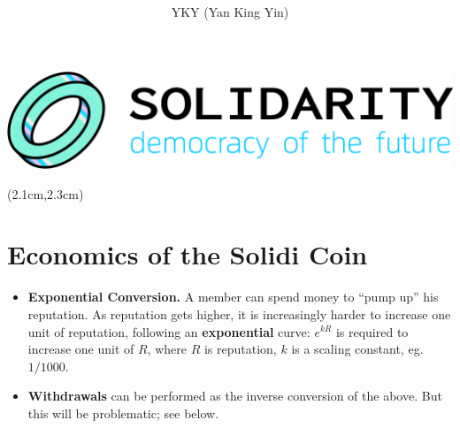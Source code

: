 \begin{preview}

\title{\vspace{-1cm} \bfseries\color{blue}{\LARGE Solidi Coin - White Paper}}

\author{YKY (Yan King Yin)} %

\centerline{\includegraphics[scale=0.3]{Solidarity-logo-0.png}}

\maketitle

\setcounter{section}{-1}
\setcounter{mypage}{0}

\begin{textblock*}{5cm}(2.1cm,2.3cm) %
{\color{red}{\large \textcircled{\small \themypage}}}
\addtocounter{mypage}{1}
\end{textblock*}

\begin{minipage}{\textwidth}
\setlength{\parskip}{0.4\baselineskip}

\section{Economics of the Solidi Coin \\}

\begin{itemize}
	\item \textbf{Exponential Conversion.}  A member can spend money to ``pump up'' his reputation.  As reputation gets higher, it is increasingly harder to increase one unit of reputation, following an \textbf{exponential} curve: $e^{kR}$ is required to increase one unit of $R$, where $R$ is reputation, $k$ is a scaling constant, eg. $1/1000$.
	
	\item \textbf{Withdrawals} can be performed as the inverse conversion of the above.  But this will be problematic; see below.
	

\end{itemize}
\end{minipage}
\end{preview}
